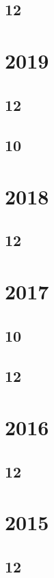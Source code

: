 \documentclass[11pt]{book}
\begin{document}
\subsection{12}

\section{2019}
\subsection{12}


\subsection{10}

\section{2018}
\subsection{12}
  
 

\section{2017}
\subsection{10}

\subsection{12}






\section{2016}
\subsection{12}


\section{2015}
\subsection{12}

\end{document}
